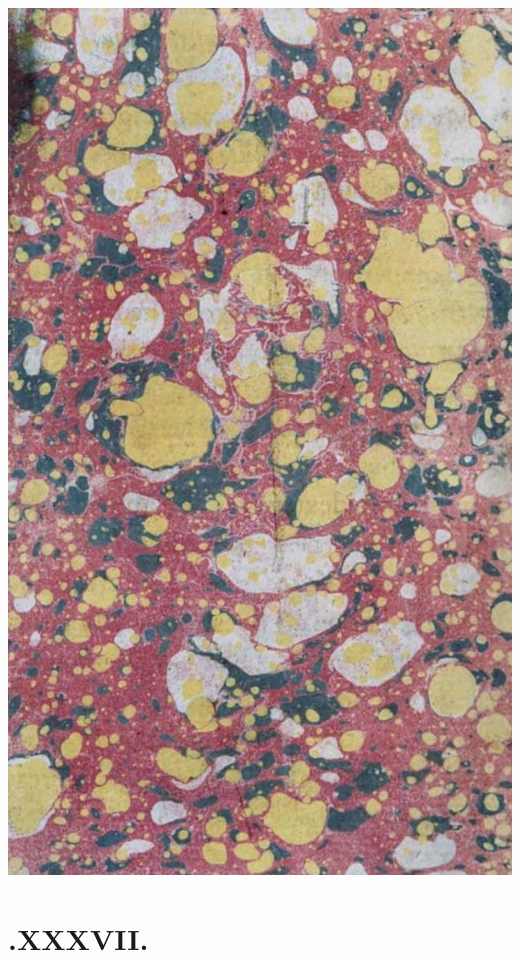 \documentclass{article}
\begin{document}
\includegraphics[width=\hsize]{marble-verso}

\newpage
\section{.\quad  XXXVII.}

\vskip -12pt
\end{document}
